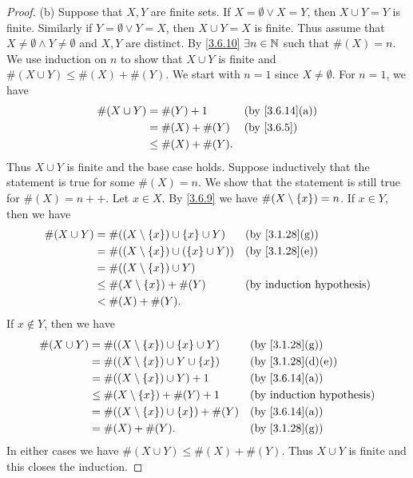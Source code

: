 \begin{proof}{(b)}
	Suppose that \(X, Y\) are finite sets.
	If \(X = \emptyset \lor X = Y\), then \(X \cup Y = Y\) is finite.
	Similarly if \(Y = \emptyset \lor Y = X\), then \(X \cup Y = X\) is finite.
	Thus assume that \(X \neq \emptyset \land Y \neq \emptyset\) and \(X, Y\) are distinct.
	By \cref{3.6.10} \(\exists n \in \mathbb{N}\) such that \(\#(X) = n\).
	We use induction on \(n\) to show that \(X \cup Y\) is finite and \(\#(X \cup Y) \leq \#(X) + \#(Y)\).
	We start with \(n = 1\) since \(X \neq \emptyset\).
	For \(n = 1\), we have
	\begin{align*}
		\#(X \cup Y) & = \#(Y) + 1         &  & \text{(by \cref{3.6.14}(a))} \\
		             & = \#(X) + \#(Y)     &  & \by{3.6.5}                   \\
		             & \leq \#(X) + \#(Y).
	\end{align*}
	Thus \(X \cup Y\) is finite and the base case holds.
	Suppose inductively that the statement is true for some \(\#(X) = n\).
	We show that the statement is still true for \(\#(X) = n++\).
	Let \(x \in X\).
	By \cref{3.6.9} we have \(\#(X \setminus \left\lbrace x\right\rbrace) = n\).
	If \(x \in Y\), then we have
	\begin{align*}
		\#(X \cup Y) & = \#((X \setminus \set{x}) \cup \set{x} \cup Y)   &  & \text{(by \cref{3.1.28}(g))} \\
		             & = \#((X \setminus \set{x}) \cup (\set{x} \cup Y)) &  & \text{(by \cref{3.1.28}(e))} \\
		             & = \#((X \setminus \set{x}) \cup Y)                                                  \\
		             & \leq \#(X \setminus \set{x}) + \#(Y)              &  & \byIH                        \\
		             & < \#(X) + \#(Y).
	\end{align*}
	If \(x \notin Y\), then we have
	\begin{align*}
		\#(X \cup Y) & = \#((X \setminus \set{x}) \cup \set{x} \cup Y)  &  & \text{(by \cref{3.1.28}(g))}    \\
		             & = \#((X \setminus \set{x}) \cup Y \cup \set{x})  &  & \text{(by \cref{3.1.28}(d)(e))} \\
		             & = \#((X \setminus \set{x}) \cup Y) + 1           &  & \text{(by \cref{3.6.14}(a))}    \\
		             & \leq \#(X \setminus \set{x}) + \#(Y) + 1         &  & \byIH                           \\
		             & = \#((X \setminus \set{x}) \cup \set{x}) + \#(Y) &  & \text{(by \cref{3.6.14}(a))}    \\
		             & = \#(X) + \#(Y).                                 &  & \text{(by \cref{3.1.28}(g))}
	\end{align*}
	In either cases we have \(\#(X \cup Y) \leq \#(X) + \#(Y)\).
	Thus \(X \cup Y\) is finite and this closes the induction.


\end{proof}
